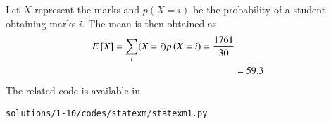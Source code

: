Let $X$ represent the marks and $p(X = i)$ be the probability of a student obtaining marks $i$.  The mean is then obtained as
\begin{align}
E{}\left[X\right] = \sum_{i}(X=i)p\left(X=i\right)= \frac{1761}{30}
\\
&= 59.3
\end{align}
The related code is available in 
\begin{lstlisting}
solutions/1-10/codes/statexm/statexm1.py
\end{lstlisting}

